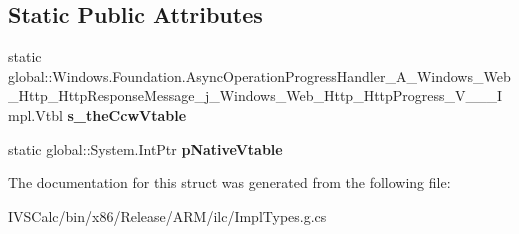 \subsection*{Static Public Attributes}
\begin{DoxyCompactItemize}
\item 
\mbox{\label{struct_windows_1_1_foundation_1_1_async_operation_progress_handler___a___windows___web___http___de22f4531f01508213e1f7c66531e51a_a7ce76c7045f4b647665a4c7b2a3c1c37}} 
static global\+::\+Windows.\+Foundation.\+Async\+Operation\+Progress\+Handler\+\_\+\+A\+\_\+\+Windows\+\_\+\+Web\+\_\+\+Http\+\_\+\+Http\+Response\+Message\+\_\+j\+\_\+\+Windows\+\_\+\+Web\+\_\+\+Http\+\_\+\+Http\+Progress\+\_\+\+V\+\_\+\+\_\+\+\_\+\+Impl.\+Vtbl {\bfseries s\+\_\+the\+Ccw\+Vtable}
\item 
\mbox{\label{struct_windows_1_1_foundation_1_1_async_operation_progress_handler___a___windows___web___http___de22f4531f01508213e1f7c66531e51a_a82503b37d8225ede9d3fbb996219c498}} 
static global\+::\+System.\+Int\+Ptr {\bfseries p\+Native\+Vtable}
\end{DoxyCompactItemize}


The documentation for this struct was generated from the following file\+:\begin{DoxyCompactItemize}
\item 
I\+V\+S\+Calc/bin/x86/\+Release/\+A\+R\+M/ilc/Impl\+Types.\+g.\+cs\end{DoxyCompactItemize}
